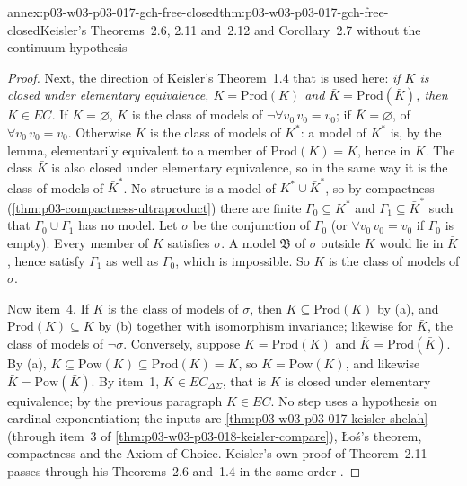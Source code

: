 \begin{annexitem}{annex:p03-w03-p03-017-gch-free-closed}{thm:p03-w03-p03-017-gch-free-closed}{Keisler's Theorems~2.6, 2.11 and~2.12 and Corollary~2.7 without the continuum hypothesis}
\begin{proof}
Next, the direction of Keisler's Theorem~1.4 that is used here: \emph{if
\(K\) is closed under elementary equivalence, \(K=\mathrm{Prod}(K)\) and
\(\bar K=\mathrm{Prod}(\bar K)\), then \(K\in EC\).}  If \(K=\varnothing\),
\(K\) is the class of models of \(\neg\forall v_0\,v_0=v_0\); if
\(\bar K=\varnothing\), of \(\forall v_0\,v_0=v_0\).  Otherwise \(K\) is the
class of models of \(K^*\): a model of \(K^*\) is, by the lemma, elementarily
equivalent to a member of \(\mathrm{Prod}(K)=K\), hence in \(K\).  The class
\(\bar K\) is also closed under elementary equivalence, so in the same way it
is the class of models of \(\bar K^*\).  No structure is a model of
\(K^*\cup\bar K^*\), so by compactness
(\cref{thm:p03-compactness-ultraproduct}) there are finite
\(\Gamma_0\subseteq K^*\) and \(\Gamma_1\subseteq\bar K^*\) such that
\(\Gamma_0\cup\Gamma_1\) has no model.  Let \(\sigma\) be the conjunction of
\(\Gamma_0\) (or \(\forall v_0\,v_0=v_0\) if \(\Gamma_0\) is empty).  Every
member of \(K\) satisfies \(\sigma\).  A model \(\mathfrak B\) of \(\sigma\)
outside \(K\) would lie in \(\bar K\), hence satisfy \(\Gamma_1\) as well as
\(\Gamma_0\), which is impossible.  So \(K\) is the class of models of
\(\sigma\).

Now item~4.  If \(K\) is the class of models of \(\sigma\), then
\(K\subseteq\mathrm{Prod}(K)\) by (a), and \(\mathrm{Prod}(K)\subseteq K\)
by (b) together with isomorphism invariance; likewise for \(\bar K\), the
class of models of \(\neg\sigma\).  Conversely, suppose
\(K=\mathrm{Prod}(K)\) and \(\bar K=\mathrm{Prod}(\bar K)\).  By (a),
\(K\subseteq\mathrm{Pow}(K)\subseteq\mathrm{Prod}(K)=K\), so
\(K=\mathrm{Pow}(K)\), and likewise \(\bar K=\mathrm{Pow}(\bar K)\).  By
item~1, \(K\in EC_{\Delta\Sigma}\), that is \(K\) is closed under elementary
equivalence; by the previous paragraph \(K\in EC\).  No step uses a
hypothesis on cardinal exponentiation; the inputs are
\cref{thm:p03-w03-p03-017-keisler-shelah} (through item~3 of
\cref{thm:p03-w03-p03-018-keisler-compare}), \L o\'s's theorem, compactness
and the Axiom of Choice.  Keisler's own proof of Theorem~2.11 passes through
his Theorems~2.6 and~1.4 in the same order
\cite[p.~488]{Keisler1961ElementaryClasses}.
\end{proof}
\end{annexitem}
